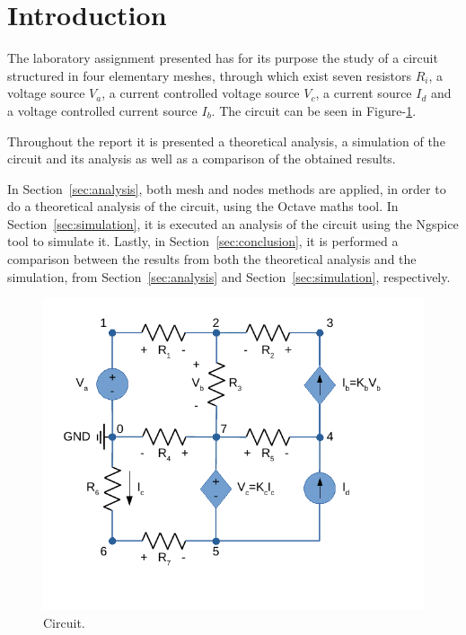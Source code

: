 \section{Introduction}
\label{sec:introduction}

The laboratory assignment presented has for its purpose the study of a circuit
structured in four elementary meshes, through which exist seven resistors $R_i$,
a voltage source $V_a$, a current controlled voltage source $V_c$, a current
source $I_d$ and a voltage controlled current source $I_b$. The circuit can
be seen in Figure-\ref{fig:circuit}.


Throughout the report it is presented a theoretical analysis, a simulation of the
circuit and its analysis as well as a comparison of the obtained results. \par
In Section~\ref{sec:analysis},  both mesh and nodes methods are applied, in order to do
a theoretical analysis of the circuit, using the Octave maths tool.
In Section~\ref{sec:simulation}, it is executed an analysis of the circuit using
the Ngspice tool to simulate it. Lastly, in Section~\ref{sec:conclusion}, it is
performed a comparison between the results from both the theoretical analysis
and the simulation, from Section~\ref{sec:analysis} and Section~\ref{sec:simulation},
respectively.


\begin{figure}[h] \centering
\includegraphics[width=0.7\linewidth]{circuit.pdf}
\caption{Circuit.}
\label{fig:circuit}
\end{figure}

